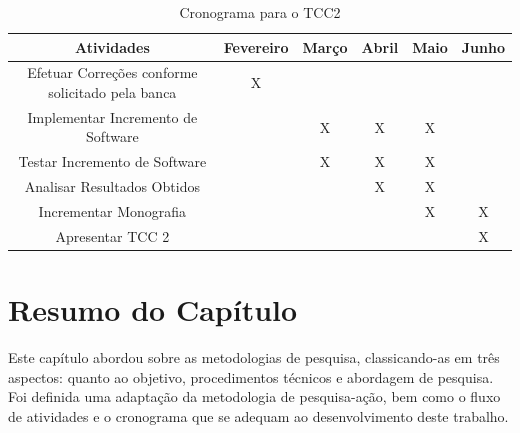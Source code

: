 \begin{table}[h]
  \tiny
  \centering
  \caption{Cronograma para o TCC2}
  \label{cronograma-tcc-2}
  \begin{tabular}{| c | c | c | c | c | c |}
  \hline
    Atividades & Fevereiro & Março & Abril & Maio & Junho \\ \hline
    Efetuar Correções conforme solicitado pela banca & X &  &  &  &  \\
    Implementar Incremento de Software &  & X & X & X &  \\
    Testar Incremento de Software &  & X & X & X &  \\
    Analisar Resultados Obtidos &  &  & X & X &  \\
    Incrementar Monografia &  &  &  & X & X \\
    Apresentar TCC 2 &  &  &  &  & X \\ \hline
  \end{tabular}
\end{table}
  
  \section{Resumo do Capítulo}
  Este capítulo abordou sobre as metodologias de pesquisa, classicando-as em três aspectos: quanto ao objetivo, procedimentos técnicos e abordagem de pesquisa. Foi definida uma adaptação da metodologia de pesquisa-ação, bem como o fluxo de atividades e o cronograma que se adequam ao desenvolvimento deste trabalho.